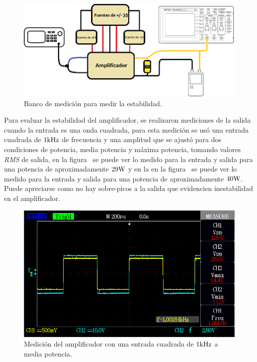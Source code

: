 \begin{figure}[H]
    \centering
    \includegraphics[width= 0.8 \textwidth]{./img/bancos/banco_salida.png}
    \caption{Banco de medición para medir la estabilidad.}
    \label{fig:banco_salida}
\end{figure}


Para evaluar la estabilidad del amplificador, se realizaron mediciones de la salida cuando la entrada es una onda cuadrada, para esta medición se usó una entrada cuadrada de $1 \si[per-mode=symbol]{\kilo\hertz}$ de frecuencia y una amplitud que se ajustó para dos condiciones de potencia, media potencia y máxima potencia, tomando valores \textit{RMS} de salida, en la figura~ se puede ver lo medido para la entrada y salida para una potencia de aproximadamente $29 \si[per-mode=symbol]{\watt}$ y en la en la figura~ se puede ver lo medido para la entrada y salida para una potencia de aproximadamente $40 \si[per-mode=symbol]{\watt}$. Puede apreciarse como no hay sobre-picos a la salida que evidencien inestabilidad en el amplificador.

\vfill

\clearpage



\begin{figure}[H]
        \centering
        \includegraphics[width=0.95 \textwidth]{./img/mediciones/Power/1.png}
        \caption{Medición del amplificador con una entrada cuadrada de $1 \si[per-mode=symbol]{\kilo\hertz}$ a media potencia.}
        \label{fig:estab1}
\end{figure}


